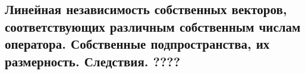 {
\subsection{Линейная независимость собственных векторов, соответствующих различным собственным числам оператора. Собственные подпространства, их размерность. Следствия. ????}
}